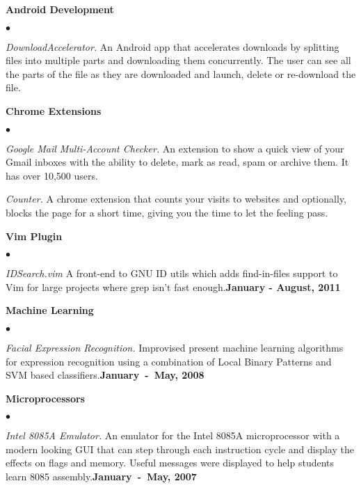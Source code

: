 \documentclass[margin,line]{res}
\newenvironment{list2}{
  \begin{list}{$\bullet$}{%
      \setlength{\itemsep}{0in}
      \setlength{\parsep}{0in} \setlength{\parskip}{0in}
      \setlength{\topsep}{0in} \setlength{\partopsep}{0in} 
      \setlength{\leftmargin}{0.2in}}}{\end{list}}
\begin{document}
\begin{resume}
{\bf Android Development}
\begin{list2}
\item {\em DownloadAccelerator.} An Android app that accelerates downloads by splitting files into multiple parts and downloading them concurrently. The user can see all the parts of the file as they are downloaded and launch, delete or re-download the file.
\end{list2}

{\bf Chrome Extensions}
\begin{list2}
\item {\em Google Mail Multi-Account Checker.} An extension to show a quick view of your Gmail inboxes with the ability to delete, mark as read, spam or archive them. It has over 10,500 users.
\item {\em Counter.} A chrome extension that counts your visits to websites and optionally, blocks the page for a short time, giving you the time to let the feeling pass.
\end{list2}

{\bf Vim Plugin}
\begin{list2}
\item {\em IDSearch.vim} A front-end to GNU ID utils which adds find-in-files support to Vim for large projects where grep isn't fast enough.\hfill {\bf January - August, 2011}
\end{list2}

{\bf Machine Learning}
\begin{list2}
\item {\em Facial Expression Recognition.} Improvised present machine learning algorithms for expression recognition using a combination of Local Binary Patterns and SVM based classifiers.\hfill {\bf January~-~May, 2008}
\end{list2}

{\bf Microprocessors}
\begin{list2}
\item {\em Intel 8085A Emulator.} An emulator for the Intel 8085A microprocessor with a modern looking GUI that can step through each instruction cycle and display the effects on flags and memory. Useful messages were displayed to help students learn 8085 assembly.\hfill {\bf January~-~May, 2007}
\end{list2}


\end{resume}
\end{document}
